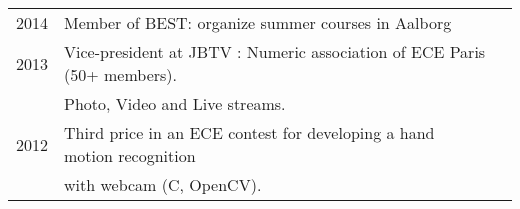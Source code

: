 \documentclass[letterpaper]{deedy-resume} %
\begin{document}
\begin{minipage}[t]{0.66\textwidth}
\begin{tabular}{rll}
2014	& Member of BEST: organize summer courses in Aalborg\\
2013	& Vice-president at JBTV : Numeric association of ECE Paris (50+ members).\\ 
		& Photo, Video and Live streams.\\
2012	& Third price in an ECE contest for developing a hand motion recognition\\
		& with webcam (C, OpenCV).\\
\end{tabular} 



\sectionspace %


\end{minipage} %








\end{document}
